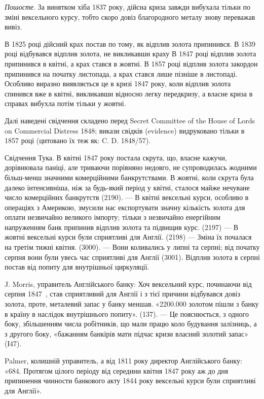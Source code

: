 
\emph{Пошосте}. За винятком хіба 1837 року, дійсна криза завжди вибухала
тільки по зміні вексельного курсу, тобто скоро довіз благородного металу знову
переважав вивіз.

В 1825 році дійсний крах постав по тому, як відплив золота припинився.
В 1839 році відбувався відплив золота, не викликавши краху В 1847 році
відплив золота припинився в квітні, а крах стався в жовтні. В 1857 році відплив
золота закордон припинився на початку листопада, а крах стався лише
пізніше в листопаді. Особливо виразно виявляється це в кризі 1847 року, коли
відплив золота спинився вже в квітні, викликавши відносно легку передкризу,
а власне криза в справах вибухла потім тільки у жовтні.

Далі наведені свідчення складено перед Secret Committee of the House of
Lords on Commercial Distress 1848; викази свідків (evidence) видруковано тільки
в 1857 році (цитовано їх теж як: C. D. 1848/57).

Свідчення Тука. В квітні 1847 року постала скрута, що, власне кажучи,
дорівнювала паніці, але триваючи порівняно недовго, не супроводилась жодними
більш-менш значними комерційними банкрутствами. В жовтні, коли скрута була
далеко інтенсивніша, ніж за будь-який період у квітні, сталося майже нечуване
число комерційних банкрутств (2190). — В квітні вексельні курси, особливо в операціях
з Америкою, змусили нас експортувати значну кількість золота для оплати
незвичайно великого імпорту; тільки з незвичайно енергійним напруженням банк
припинив відплив золота та підвищив курс. (2197) — В жовтні вексельні курси
були сприятливі для Англії. (2198) — Зміна їх почалася на третім тижні квітня.
(3000). — Вони коливались у липні та серпні; від початку серпня вони були
увесь час сприятливі для Англії (3001). Відплив золота в серпні постав від
попиту для внутрішньої циркуляції.

J. Morris, управитель Англійського банку: Хоч вексельний курс, починаючи
від серпня 1847~, став сприятливий для Англії і з тієї причини відбувався довіз
золота, проте, металевий запас у банку меншав. «\num{2200.000} золотом пішли
з банку в країну в наслідок внутрішнього попиту». (137). — Це пояснюється,
з одного боку, збільшенням числа робітників, що мали працю коло будування
залізниць, а з другого боку, «бажанням банкірів мати підчас кризи власний
золотий запас» (І47).

Palmer, колишній управитель, а від 1811 року директор Англійського банку:
«684. Протягом цілого періоду від середини квітня 1847 року аж до
дня припинення чинности банкового акту 1844 року вексельні курси були
сприятливі для Англії».

